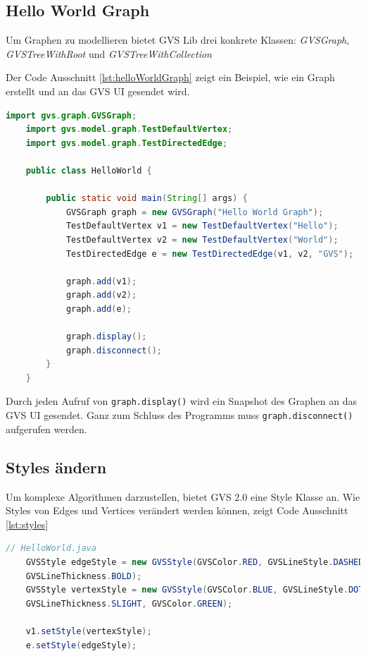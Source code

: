 \documentclass[11pt,a4paper,english,oneside]{book}
\numberwithin{equation}{chapter}
\begin{document}
	\subsection{Hello World Graph}
	Um Graphen zu modellieren bietet GVS Lib drei konkrete Klassen: \textit{GVSGraph}, \textit{GVSTreeWithRoot} und \textit{GVSTreeWithCollection}
	
	Der Code Ausschnitt \ref{lst:helloWorldGraph} zeigt ein Beispiel, wie ein Graph erstellt und an das GVS UI gesendet wird.
	
	\begin{lstlisting}[language=java, frame=single, caption={Hello World Graph}, label={lst:helloWorldGraph}]
	import gvs.graph.GVSGraph;
	import gvs.model.graph.TestDefaultVertex;
	import gvs.model.graph.TestDirectedEdge;
	
	public class HelloWorld {
	
		public static void main(String[] args) {
			GVSGraph graph = new GVSGraph("Hello World Graph");
			TestDefaultVertex v1 = new TestDefaultVertex("Hello");
			TestDefaultVertex v2 = new TestDefaultVertex("World");
			TestDirectedEdge e = new TestDirectedEdge(v1, v2, "GVS");
			
			graph.add(v1);
			graph.add(v2);
			graph.add(e);
			
			graph.display();
			graph.disconnect();
		}
	}
	\end{lstlisting}	
	
	Durch jeden Aufruf von \lstinline{graph.display()} wird ein Snapshot des Graphen an das GVS UI gesendet. Ganz zum Schluss des Programms muss \lstinline{graph.disconnect()} aufgerufen werden.
	
	\subsection{Styles ändern}
	Um komplexe Algorithmen darzustellen, bietet GVS 2.0 eine Style Klasse an. Wie Styles von Edges und Vertices verändert werden können, zeigt Code Ausschnitt \ref{lst:styles}
	
	\begin{lstlisting}[language=java, frame=single, caption={Styles verändern}, label={lst:styles}]
	// HelloWorld.java
	GVSStyle edgeStyle = new GVSStyle(GVSColor.RED, GVSLineStyle.DASHED,
	GVSLineThickness.BOLD);
	GVSStyle vertexStyle = new GVSStyle(GVSColor.BLUE, GVSLineStyle.DOTTED,
	GVSLineThickness.SLIGHT, GVSColor.GREEN);
	
	v1.setStyle(vertexStyle);
	e.setStyle(edgeStyle);
	\end{lstlisting}	
	
\end{document}
